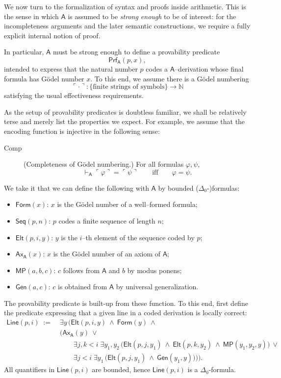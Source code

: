 \documentclass[reqno]{asl}
\makeatletter
\def\namedlabel#1#2{\begingroup
   \def\@currentlabel{#2}%
   \label{#1}\endgroup
}
\newcommand{\proves}{\vdash}
\newcommand{\pa}{\textsf{A}}
\newcommand{\Prf}{\textsf{Prf}}
\newcommand{\Line}{\textsf{Line}}
\newcommand{\Form}{\textsf{Form}}
\newcommand{\Ax}{\textsf{Ax}}
\newcommand{\Seq}{\textsf{Seq}}
\newcommand{\MP}{\textsf{MP}}
\newcommand{\Gen}{\textsf{Gen}}
\newcommand{\Elt}{\textsf{Elt}}
\makeatother
\begin{document}
We now turn to the formalization of syntax and proofs inside arithmetic. This is the sense in which $\pa$ is assumed to be \emph{strong enough} to be of interest: for the incompleteness arguments and the later semantic constructions, we require a fully explicit internal notion of proof.

In particular, $\pa$ must be strong enough to define a provability predicate
\[
\Prf_{\pa}(p,x),
\]
intended to express that the natural number $p$ codes a $\pa$--derivation whose final formula has G\"odel number $x$. To this end, we assume there is a G\"odel numbering
\[
\ulcorner\cdot\urcorner : \{\text{finite strings of symbols}\} \to \mathbb{N}
\]
satisfying the usual effectiveness requirements. 

As the setup of provability predicates is doubtless familiar, we shall be relatively terse and merely list the properties we expect. For example, we assume that the encoding function is injective in the following sense:
\begin{description}
\item[Comp] \namedlabel{desc:completeness-encoding}{\textbf{Comp}} (Completeness of G\"odel numbering.)
For all formulas $\varphi,\psi$,
\[
\proves_{\pa} \ulcorner \varphi \urcorner = \ulcorner \psi \urcorner 
\qquad \text{iff} \qquad  
\varphi = \psi.
\]
\end{description} \medskip

We take it that we can define the following with $\pa$ by bounded ($\Delta_0$-)formulas:
\begin{itemize}
\item $\Form(x)$: $x$ is the G\"odel number of a well--formed formula;
\item $\Seq(p,n)$: $p$ codes a finite sequence of length $n$;
\item $\Elt(p,i,y)$: $y$ is the $i$--th element of the sequence coded by $p$;
\item $\Ax_{\pa}(x)$: $x$ is the G\"odel number of an axiom of $\pa$;
\item $\MP(a,b,c)$: $c$ follows from $\pa$ and $b$ by modus ponens;
\item $\Gen(a,c)$: $c$ is obtained from $\pa$ by universal generalization.
\end{itemize}

The provability predicate is built-up from these function. To this end, first define the predicate expressing that a given line in a coded derivation is locally correct:
\[
\begin{aligned}
\Line(p,i)\;:=\;&
\exists y\,\Big(
\Elt(p,i,y)\ \wedge\ \Form(y)\ \wedge\\
&\Big(
\Ax_{\pa}(y)\ \lor\\
&\qquad
\exists j,k<i\;\exists y_1,y_2\,
\big(
\Elt(p,j,y_1)\ \wedge\
\Elt(p,k,y_2)\ \wedge\
\MP(y_1,y_2,y)
\big)\ \lor\\
&\qquad
\exists j<i\;\exists y_1\,
\big(
\Elt(p,j,y_1)\ \wedge\
\Gen(y_1,y)
\big)
\Big)
\Big).
\end{aligned}
\]
All quantifiers in $\Line(p,i)$ are bounded, hence $\Line(p,i)$ is a $\Delta_0$-formula.
\end{document}
